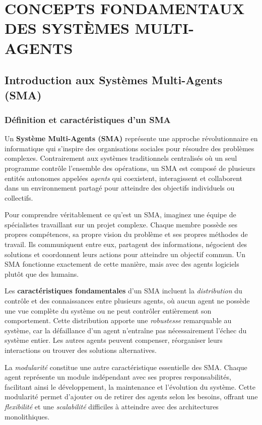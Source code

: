 \chapter*{ CONCEPTS FONDAMENTAUX DES SYSTÈMES MULTI-AGENTS}

\section{Introduction aux Systèmes Multi-Agents (SMA)}

\subsection{Définition et caractéristiques d'un SMA}

Un \textbf{Système Multi-Agents (SMA)} représente une approche révolutionnaire en informatique qui s'inspire des organisations sociales pour résoudre des problèmes complexes. Contrairement aux systèmes traditionnels centralisés où un seul programme contrôle l'ensemble des opérations, un SMA est composé de plusieurs entités autonomes appelées \emph{agents} qui coexistent, interagissent et collaborent dans un environnement partagé pour atteindre des objectifs individuels ou collectifs.

Pour comprendre véritablement ce qu'est un SMA, imaginez une équipe de spécialistes travaillant sur un projet complexe. Chaque membre possède ses propres compétences, sa propre vision du problème et ses propres méthodes de travail. Ils communiquent entre eux, partagent des informations, négocient des solutions et coordonnent leurs actions pour atteindre un objectif commun. Un SMA fonctionne exactement de cette manière, mais avec des agents logiciels plutôt que des humains.

Les \textbf{caractéristiques fondamentales} d'un SMA incluent la \emph{distribution} du contrôle et des connaissances entre plusieurs agents, où aucun agent ne possède une vue complète du système ou ne peut contrôler entièrement son comportement. Cette distribution apporte une \emph{robustesse} remarquable au système, car la défaillance d'un agent n'entraîne pas nécessairement l'échec du système entier. Les autres agents peuvent compenser, réorganiser leurs interactions ou trouver des solutions alternatives.

La \emph{modularité} constitue une autre caractéristique essentielle des SMA. Chaque agent représente un module indépendant avec ses propres responsabilités, facilitant ainsi le développement, la maintenance et l'évolution du système. Cette modularité permet d'ajouter ou de retirer des agents selon les besoins, offrant une \emph{flexibilité} et une \emph{scalabilité} difficiles à atteindre avec des architectures monolithiques.

